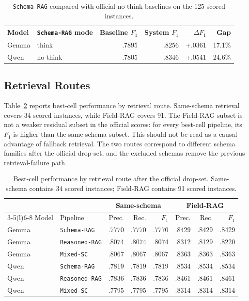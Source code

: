 \begin{table}[!htbp]
\centering
\caption{\texttt{Schema-RAG} compared with official no-think baselines on the 125 scored instances.}
\label{tab:component-deltas}
\scriptsize
\begin{tabular}{@{}llrrrr@{}}
\toprule
Model & \texttt{Schema-RAG} mode & Baseline \(F_1\) & System \(F_1\) & \(\Delta F_1\) & Gap \\
\midrule
Gemma & think & .7895 & .8256 & +.0361 & 17.1\% \\
Qwen & no-think & .7805 & .8346 & +.0541 & 24.6\% \\
\bottomrule
\end{tabular}
\end{table}

\subsection{Retrieval Routes}

Table~\ref{tab:route-performance} reports best-cell performance by retrieval route. Same-schema retrieval covers 34 scored instances, while Field-RAG covers 91. The Field-RAG subset is not a weaker residual subset in the official scores: for every best-cell pipeline, its \(F_1\) is higher than the same-schema subset. This should not be read as a causal advantage of fallback retrieval. The two routes correspond to different schema families after the official drop-set, and the excluded schemas remove the previous retrieval-failure path.

\begin{table}[!htbp]
\centering
\caption{Best-cell performance by retrieval route after the official drop-set. Same-schema contains 34 scored instances; Field-RAG contains 91 scored instances.}
\label{tab:route-performance}
\scriptsize
\begin{tabular}{@{}llrrrrrr@{}}
\toprule
& & \multicolumn{3}{c}{Same-schema} & \multicolumn{3}{c}{Field-RAG} \\
\cmidrule(lr){3-5}\cmidrule(l){6-8}
Model & Pipeline & Prec. & Rec. & \(F_1\) & Prec. & Rec. & \(F_1\) \\
\midrule
Gemma & \texttt{Schema-RAG} & .7770 & .7770 & .7770 & .8429 & .8429 & .8429 \\
Gemma & \texttt{Reasoned-RAG} & .8074 & .8074 & .8074 & .8312 & .8129 & .8220 \\
Gemma & \texttt{Mixed-SC} & .8067 & .8067 & .8067 & .8363 & .8363 & .8363 \\
\midrule
Qwen & \texttt{Schema-RAG} & .7819 & .7819 & .7819 & .8534 & .8534 & .8534 \\
Qwen & \texttt{Reasoned-RAG} & .7836 & .7836 & .7836 & .8461 & .8461 & .8461 \\
Qwen & \texttt{Mixed-SC} & .7795 & .7795 & .7795 & .8314 & .8314 & .8314 \\
\bottomrule
\end{tabular}
\end{table}

